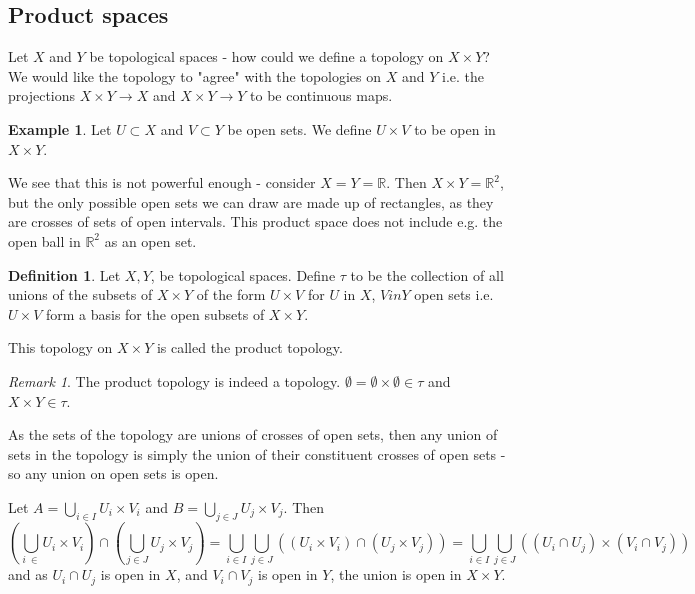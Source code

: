 \documentclass{article}
\theoremstyle{definition}
\newtheorem{defn}{Definition}[section]
\newtheorem{exmp}{Example}[section]
\theoremstyle{plain}%
\theoremstyle{remark}
\newtheorem*{rem}{Remark}
\newcommand{\Union}{\bigcup}
\newcommand{\intersection}{\cap}
\newcommand{\cross}{\times}
\newcommand{\R}{\mathbb{R}}
\begin{document}
\subsection{Product spaces}

Let $X$ and $Y$ be topological spaces - how could we define a topology on $X \cross Y$? We would like the topology to "agree" with the topologies on $X$ and $Y$ i.e. the projections $X \cross Y \to X$ and $X \cross Y \to Y$ to be continuous maps.

\begin{exmp}
    Let $U \subset X$ and $V \subset Y$ be open sets. We define $U \cross V$ to be open in $X \cross Y$.

    We see that this is not powerful enough - consider $X = Y = \R$. Then $X \cross Y = \R^2$, but the only possible open sets we can draw are made up of rectangles, as they are crosses of sets of open intervals. This product space does not include e.g. the open ball in $\R^2$ as an open set.
\end{exmp}

\begin{defn}
    Let $X, Y$, be topological spaces. Define $\tau$ to be the collection of all unions of the subsets of $X \cross Y$ of the form $U \cross V$ for $U$ in $X$, $V in Y$ open sets i.e. $U \times V$ form a basis for the open subsets of $X \times Y$.

    This topology on $X \cross Y$ is called the product topology.
\end{defn}

\begin{rem}
    The product topology is indeed a topology. $\emptyset = \emptyset \cross \emptyset \in \tau$ and $X \cross Y \in \tau$.

    As the sets of the topology are unions of crosses of open sets, then any union of sets in the topology is simply the union of their constituent crosses of open sets - so any union on open sets is open.

    Let $A = \Union_{i \in I} U_i \cross V_i$ and $B = \Union_{j \in J} U_j \cross V_j$. Then
    \[\left(\Union_{i\ \in } U_i \cross V_i\right) \intersection \left( \Union_{j \in J} U_j \cross V_j \right) = \Union_{i \in I} \Union_{j \in J} \left( (U_i \cross V_i) \intersection (U_j \cross V_j) \right) = \Union_{i \in I}\Union_{j \in J} \left( (U_i \intersection U_j) \cross (V_i \intersection V_j) \right) \]
    and as $U_i \intersection U_j$ is open in $X$, and $V_i \intersection V_j$ is open in $Y$, the union is open in $X \cross Y$.
\end{rem}
\end{document}
